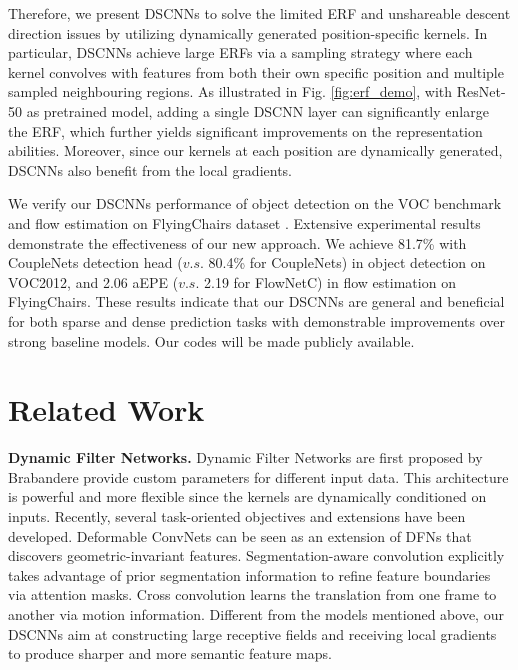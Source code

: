 \documentclass[runningheads]{llncs}
\begin{document}
Therefore, we present DSCNNs to solve the limited ERF and unshareable descent direction issues by utilizing dynamically generated position-specific kernels. In particular, DSCNNs achieve large ERFs via a sampling strategy where each kernel convolves with features from both their own specific position and multiple sampled neighbouring regions. As illustrated in Fig. \ref{fig:erf_demo}, with ResNet-50 as pretrained model, adding a single DSCNN layer can significantly enlarge the ERF, which further yields significant improvements on the representation abilities. Moreover, since our kernels at each position are dynamically generated, DSCNNs also benefit from the local gradients. 

We verify our DSCNNs performance of object detection on the VOC benchmark \cite{Everingham10} and flow estimation on FlyingChairs dataset \cite{DFIB15}. Extensive experimental results demonstrate the effectiveness of our new approach. We achieve 81.7\% with CoupleNets detection head ($v.s.$ 80.4\% for CoupleNets) in object detection on VOC2012, and 2.06 aEPE  ($v.s.$ 2.19 for FlowNetC) in flow estimation on FlyingChairs. 
These results indicate that our DSCNNs are general and beneficial for both sparse and dense prediction tasks with demonstrable improvements over strong baseline models. Our codes will be made publicly available.

\section{Related Work}
\noindent\textbf{Dynamic Filter Networks.}
Dynamic Filter Networks \cite{de2016dynamic} are first proposed by Brabandere \etal\to provide custom parameters for different input data. This architecture is powerful and more flexible since the kernels are dynamically conditioned on inputs. Recently, several task-oriented objectives and extensions have been developed. Deformable ConvNets \cite{dai2017deformable} can be seen as an extension of DFNs that discovers geometric-invariant features. Segmentation-aware convolution \cite{harley2017segmentation} explicitly takes advantage of prior segmentation information to refine feature boundaries via attention masks. 
Cross convolution \cite{xue2016visual} learns the translation from one frame to another via motion information. Different from the models mentioned above, our DSCNNs aim at constructing large receptive fields and receiving local gradients to produce sharper and more semantic feature maps. \\
\end{document}
